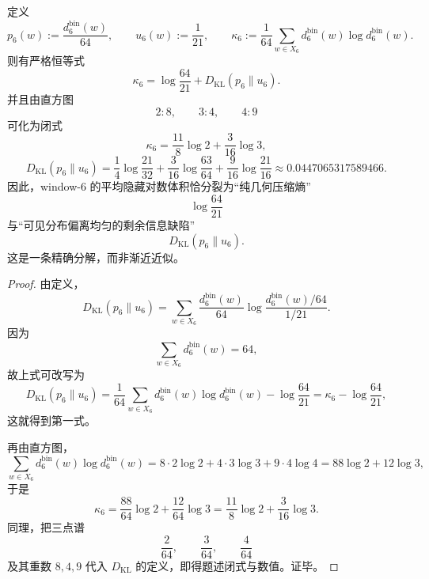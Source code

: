 \begin{theorem}\label{thm:conclusion-window6-hidden-logvolume-geometry-information-splitting}
定义
\[
p_6(w):=\frac{d_6^{\mathrm{bin}}(w)}{64},
\qquad
u_6(w):=\frac1{21},
\qquad
\kappa_6:=\frac1{64}\sum_{w\in X_6}d_6^{\mathrm{bin}}(w)\log d_6^{\mathrm{bin}}(w).
\]
则有严格恒等式
\[
\kappa_6=\log\frac{64}{21}+D_{\mathrm{KL}}(p_6\|u_6).
\]
并且由直方图
\[
2:8,\qquad 3:4,\qquad 4:9
\]
可化为闭式
\[
\kappa_6=\frac{11}{8}\log 2+\frac{3}{16}\log 3,
\]
\[
D_{\mathrm{KL}}(p_6\|u_6)
=
\frac14\log\frac{21}{32}
+\frac{3}{16}\log\frac{63}{64}
+\frac{9}{16}\log\frac{21}{16}
\approx 0.0447065317589466.
\]
因此，window-\(6\) 的平均隐藏对数体积恰分裂为“纯几何压缩熵”
\[
\log\frac{64}{21}
\]
与“可见分布偏离均匀的剩余信息缺陷”
\[
D_{\mathrm{KL}}(p_6\|u_6).
\]
这是一条精确分解，而非渐近近似。
\end{theorem}
\begin{proof}
由定义，
\[
D_{\mathrm{KL}}(p_6\|u_6)
=
\sum_{w\in X_6}\frac{d_6^{\mathrm{bin}}(w)}{64}
\log\frac{d_6^{\mathrm{bin}}(w)/64}{1/21}.
\]
因为
\[
\sum_{w\in X_6}d_6^{\mathrm{bin}}(w)=64,
\]
故上式可改写为
\[
D_{\mathrm{KL}}(p_6\|u_6)
=
\frac1{64}\sum_{w\in X_6}d_6^{\mathrm{bin}}(w)\log d_6^{\mathrm{bin}}(w)-\log\frac{64}{21}
=
\kappa_6-\log\frac{64}{21},
\]
这就得到第一式。

再由直方图，
\[
\sum_{w\in X_6}d_6^{\mathrm{bin}}(w)\log d_6^{\mathrm{bin}}(w)
=
8\cdot 2\log 2+4\cdot 3\log 3+9\cdot 4\log 4
=
88\log 2+12\log 3,
\]
于是
\[
\kappa_6
=
\frac{88}{64}\log 2+\frac{12}{64}\log 3
=
\frac{11}{8}\log 2+\frac{3}{16}\log 3.
\]
同理，把三点谱
\[
\frac{2}{64},\qquad \frac{3}{64},\qquad \frac{4}{64}
\]
及其重数 \(8,4,9\) 代入 \(D_{\mathrm{KL}}\) 的定义，即得题述闭式与数值。证毕。
\end{proof}

